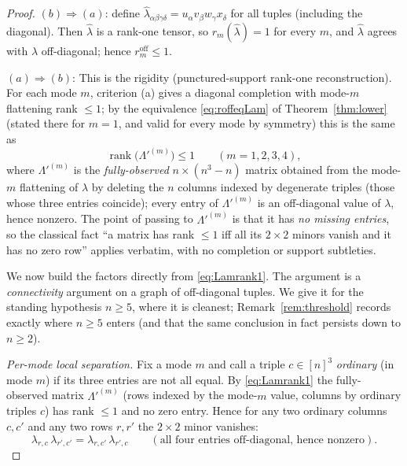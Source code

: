 \begin{proof}
$(b)\Rightarrow(a)$: define $\widehat\lambda_{\alpha\beta\gamma\delta}
=u_\alpha v_\beta w_\gamma x_\delta$ for all tuples (including the diagonal). Then
$\widehat\lambda$ is a rank-one tensor, so $r_m(\widehat\lambda)=1$ for every $m$, and
$\widehat\lambda$ agrees with $\lambda$ off-diagonal; hence $r_m^{\mathrm{off}}\le1$.

$(a)\Rightarrow(b)$: This is the rigidity (punctured-support rank-one
reconstruction). For each mode $m$, criterion (a) gives a diagonal completion with mode-$m$
flattening rank $\le1$; by the equivalence \eqref{eq:roffeqLam} of Theorem~\ref{thm:lower}
(stated there for $m=1$, and valid for every mode by symmetry) this is the same as
\begin{equation}\label{eq:Lamrank1}
\operatorname{rank}\big(\Lambda'^{(m)}\big)\le1\qquad(m=1,2,3,4),
\end{equation}
where $\Lambda'^{(m)}$ is the \emph{fully-observed} $n\times(n^3-n)$ matrix obtained from the
mode-$m$ flattening of $\lambda$ by deleting the $n$ columns indexed by degenerate triples
(those whose three entries coincide); every entry of $\Lambda'^{(m)}$ is an off-diagonal
value of $\lambda$, hence nonzero. The point of passing to $\Lambda'^{(m)}$ is that it has
\emph{no missing entries}, so the classical fact ``a matrix has rank $\le1$ iff all its
$2\times2$ minors vanish and it has no zero row'' applies verbatim, with no completion or
support subtleties.

We now build the factors directly from \eqref{eq:Lamrank1}. The argument is a
\emph{connectivity} argument on a graph of off-diagonal tuples. We give it for the standing
hypothesis $n\ge5$, where it is cleanest; Remark~\ref{rem:threshold} records exactly where
$n\ge5$ enters (and that the same conclusion in fact persists down to $n\ge2$).

\medskip\noindent\emph{Per-mode local separation.} Fix a mode $m$ and call a triple
$c\in[n]^3$ \emph{ordinary} (in mode $m$) if its three entries are not all equal. By
\eqref{eq:Lamrank1} the fully-observed matrix $\Lambda'^{(m)}$ (rows indexed by the
mode-$m$ value, columns by ordinary triples $c$) has rank $\le1$ and no zero entry. Hence
for any two ordinary columns $c,c'$ and any two rows $r,r'$ the $2\times2$ minor vanishes:
\begin{equation}\label{eq:edgerel}
\lambda_{r,c}\,\lambda_{r',c'}=\lambda_{r,c'}\,\lambda_{r',c}
\qquad(\text{all four entries off-diagonal, hence nonzero}).
\end{equation}


\end{proof}
